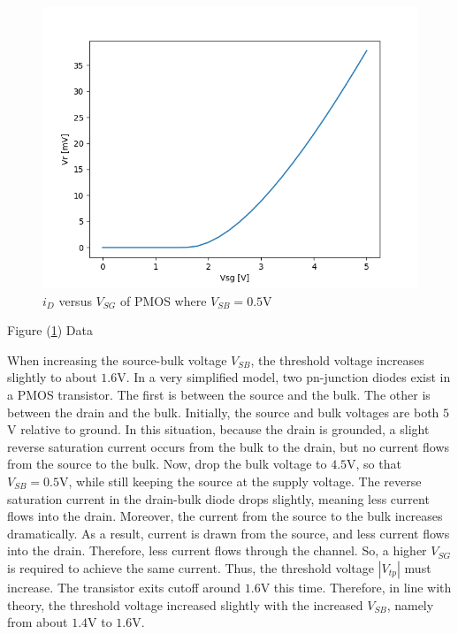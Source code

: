 \FloatBarrier

\begin{figure}[h!]
	\centering
	\includegraphics[scale=0.75]{../images/data_3_b.PNG}
	\caption{$i_{D}$ versus $V_{SG}$ of PMOS where $V_{SB}= 0.5$\si{\volt}}
	\label{fig:data_3_b}
\end{figure}

\FloatBarrier

\FloatBarrier

\begin{table}[h!]
	\centering
	\caption{Figure (\ref{fig:data_3_b}) Data}
	\label{tab:data_3_b}
\end{table}

\FloatBarrier

When increasing the source-bulk voltage $V_{SB}$, the threshold voltage increases slightly to about $1.6$\si{\volt}.
In a very simplified model, two pn-junction diodes exist in a PMOS transistor.
The first is between the source and the bulk.
The other is between the drain and the bulk.
Initially, the source and bulk voltages are both $5$\si{\volt} relative to ground.
In this situation, because the drain is grounded, a slight reverse saturation current occurs from the bulk to the drain, but no current flows from the source to the bulk.
Now, drop the bulk voltage to $4.5$\si{\volt}, so that $V_{SB} = 0.5$\si{\volt}, while still keeping the source at the supply voltage.
The reverse saturation current in the drain-bulk diode drops slightly, meaning less current flows into the drain.
Moreover, the current from the source to the bulk increases dramatically.
As a result, current is drawn from the source, and less current flows into the drain.
Therefore, less current flows through the channel.
So, a higher $V_{SG}$ is required to achieve the same current.
Thus, the threshold voltage $|V_{tp}|$ must increase.
The transistor exits cutoff around $1.6$\si{\volt} this time.
Therefore, in line with theory, the threshold voltage increased slightly with the increased $V_{SB}$, namely from about $1.4$\si{\volt} to $1.6$\si{\volt}.

